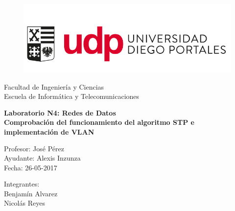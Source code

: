 \documentclass[onecolumn,11pts]{IEEEtran}
\date{November 2016}
\begin{document}
\begin{titlepage}

\begin{center}
\vspace*{-1in}
\begin{figure}[htb]
\begin{center}
\includegraphics[scale=0.4]{logo_udp}
\end{center}
\end{figure}
Facultad de Ingeniería y Ciencias\\Escuela de Informática y Telecomunicaciones\\
\vspace*{0.15in}
\vspace*{1in}

\begin{LARGE}
\textbf{Laboratorio N4: Redes de Datos\\
Comprobación del funcionamiento del algoritmo STP e\\
implementación de VLAN} \\
\end{LARGE}
\vspace*{1in}
\begin{large}
Profesor: José Pérez \\Ayudante: Alexis Inzunza \\ Fecha: 26-05-2017
\end{large}
\vspace*{0.3in}
\vspace*{1in}
\begin{large}
\begin{flushright}

Integrantes: \\
Benjamín Alvarez \\ Nicolás Reyes \\ 
\end{flushright}
\end{large}
\end{center}
\end{titlepage}


\tableofcontents %
\end{document}
